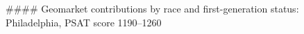 #### Geomarket contributions by race and first-generation status: Philadelphia, PSAT score 1190–1260
